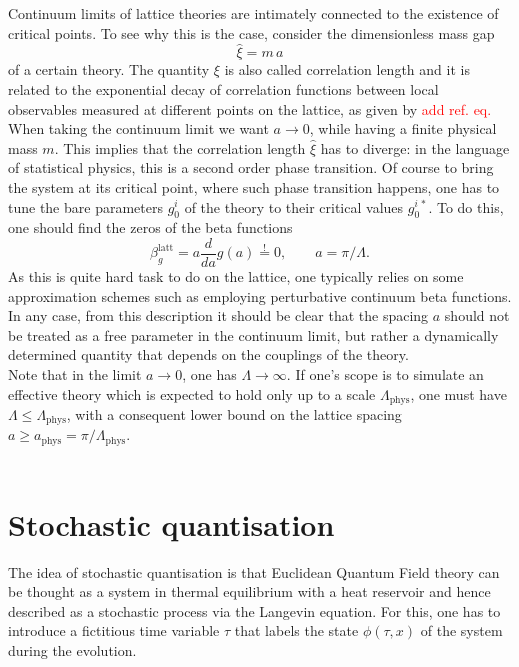 Continuum limits of lattice theories are intimately connected to the existence of critical points. To see why this is the case, consider the dimensionless mass gap 
\begin{equation*}   
    \hat\xi = m \, a
\end{equation*} 
of a certain theory. The quantity $\xi$ is also called correlation length and it is related to the exponential decay of correlation functions between local observables measured
at different points on the lattice, as given by \textcolor{red}{add ref. eq.}\\
When taking the continuum limit we want $a \to 0$, while having a finite physical mass $m$. This implies that the correlation length $\hat \xi$ has to diverge: in the language of statistical physics, this is a second order phase transition. Of course to bring the system at its critical point, where such phase transition happens, one has to tune the bare parameters $g_0^i$ of the theory to their critical values $g_0^{i \, *}$. 
To do this, one should find the zeros of the beta functions
\begin{equation*}
    \beta_g^\text{latt} = a \frac{d}{da} g(a) \overset{!}{=} 0, \qquad a = \pi/\Lambda.
\end{equation*}
As this is quite hard task to do on the lattice, one typically relies on some approximation schemes such as employing perturbative continuum beta functions. \\
In any case, from this description it should be clear that the spacing $a$ should not be treated as a free parameter in the continuum limit, but rather a dynamically determined quantity that depends on the couplings of the theory.\\
Note that in the limit $a \to 0$, one has $\Lambda \to \infty$. If one's scope is to simulate an effective theory which is expected to hold only up to a scale $\Lambda_\text{phys}$, one must have $\Lambda \leq \Lambda_\text{phys}$, with a consequent lower bound on the lattice spacing $a \geq a_\text{phys} = \pi / \Lambda_\text{phys}$. \\ ~

\section{Stochastic quantisation}
\label{sec:stochastic_quantisation}
The idea of stochastic quantisation \cite{ParisiWu,Damgaard1987StochasticQuantization} is that Euclidean Quantum Field theory can be thought as a system in thermal equilibrium with a heat reservoir and hence described as a stochastic process via the Langevin equation. For this, one has to introduce a fictitious time variable $\tau$ that labels the state $\phi(\tau, x)$ of the system 
during the evolution. \\
